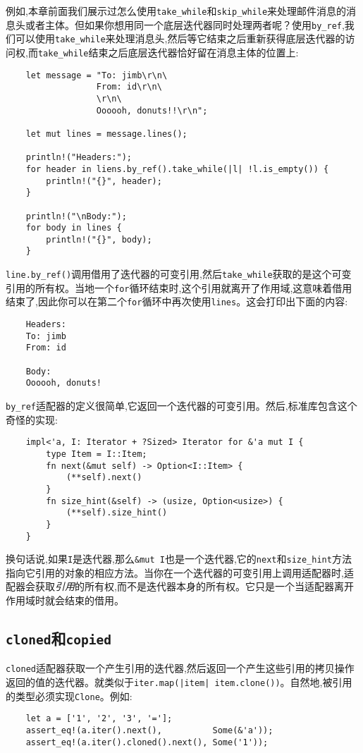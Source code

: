 例如,本章前面我们展示过怎么使用\texttt{take\_while}和\texttt{skip\_while}来处理邮件消息的消息头或者主体。但如果你想用同一个底层迭代器同时处理两者呢？使用\texttt{by\_ref},我们可以使用\texttt{take\_while}来处理消息头,然后等它结束之后重新获得底层迭代器的访问权,而\texttt{take\_while}结束之后底层迭代器恰好留在消息主体的位置上:
\begin{verbatim}
    let message = "To: jimb\r\n\
                  From: id\r\n\
                  \r\n\
                  Oooooh, donuts!!\r\n";

    let mut lines = message.lines();

    println!("Headers:");
    for header in liens.by_ref().take_while(|l| !l.is_empty()) {
        println!("{}", header);
    }

    println!("\nBody:");
    for body in lines {
        println!("{}", body);
    }
\end{verbatim}
\texttt{line.by\_ref()}调用借用了迭代器的可变引用,然后\texttt{take\_while}获取的是这个可变引用的所有权。当地一个\texttt{for}循环结束时,这个引用就离开了作用域,这意味着借用结束了,因此你可以在第二个\texttt{for}循环中再次使用\texttt{lines}。这会打印出下面的内容:
\begin{verbatim}
    Headers:
    To: jimb
    From: id

    Body:
    Oooooh, donuts!
\end{verbatim}

\texttt{by\_ref}适配器的定义很简单,它返回一个迭代器的可变引用。然后,标准库包含这个奇怪的实现:
\begin{verbatim}
    impl<'a, I: Iterator + ?Sized> Iterator for &'a mut I {
        type Item = I::Item;
        fn next(&mut self) -> Option<I::Item> {
            (**self).next()
        }
        fn size_hint(&self) -> (usize, Option<usize>) {
            (**self).size_hint()
        }
    }
\end{verbatim}

换句话说,如果\texttt{I}是迭代器,那么\texttt{\&mut I}也是一个迭代器,它的\texttt{next}和\texttt{size\_hint}方法指向它引用的对象的相应方法。当你在一个迭代器的可变引用上调用适配器时,适配器会获取\emph{引用}的所有权,而不是迭代器本身的所有权。它只是一个当适配器离开作用域时就会结束的借用。

\subsection{\texttt{cloned}和\texttt{copied}}
\texttt{cloned}适配器获取一个产生引用的迭代器,然后返回一个产生这些引用的拷贝操作返回的值的迭代器。就类似于\texttt{iter.map(|item| item.clone())}。自然地,被引用的类型必须实现\texttt{Clone}。例如:
\begin{verbatim}
    let a = ['1', '2', '3', '='];
    assert_eq!(a.iter().next(),          Some(&'a'));
    assert_eq!(a.iter().cloned().next(), Some('1'));
\end{verbatim}

